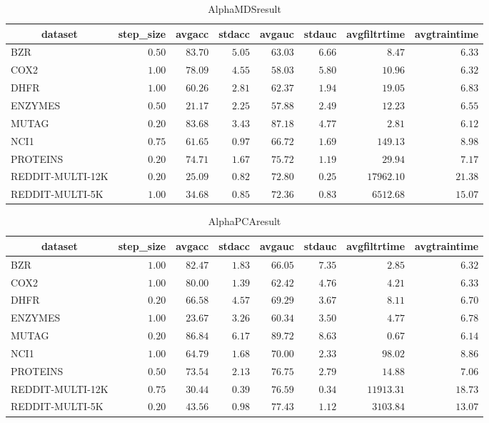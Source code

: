 \begin{table}[!tbp]
\caption{AlphaMDSresult\label{AlphaMDSresult}} 
{\centering
\begin{tabular}{lrrrrrrr}
\hline\hline
\multicolumn{1}{c}{dataset}&\multicolumn{1}{c}{step_size}&\multicolumn{1}{c}{avgacc}&\multicolumn{1}{c}{stdacc}&\multicolumn{1}{c}{avgauc}&\multicolumn{1}{c}{stdauc}&\multicolumn{1}{c}{avgfiltrtime}&\multicolumn{1}{c}{avgtraintime}\tabularnewline
\hline
BZR&$0.50$&$83.70$&$5.05$&$63.03$&$6.66$&$    8.47$&$ 6.33$\tabularnewline
COX2&$1.00$&$78.09$&$4.55$&$58.03$&$5.80$&$   10.96$&$ 6.32$\tabularnewline
DHFR&$1.00$&$60.26$&$2.81$&$62.37$&$1.94$&$   19.05$&$ 6.83$\tabularnewline
ENZYMES&$0.50$&$21.17$&$2.25$&$57.88$&$2.49$&$   12.23$&$ 6.55$\tabularnewline
MUTAG&$0.20$&$83.68$&$3.43$&$87.18$&$4.77$&$    2.81$&$ 6.12$\tabularnewline
NCI1&$0.75$&$61.65$&$0.97$&$66.72$&$1.69$&$  149.13$&$ 8.98$\tabularnewline
PROTEINS&$0.20$&$74.71$&$1.67$&$75.72$&$1.19$&$   29.94$&$ 7.17$\tabularnewline
REDDIT-MULTI-12K&$0.20$&$25.09$&$0.82$&$72.80$&$0.25$&$17962.10$&$21.38$\tabularnewline
REDDIT-MULTI-5K&$1.00$&$34.68$&$0.85$&$72.36$&$0.83$&$ 6512.68$&$15.07$\tabularnewline
\hline
\end{tabular}}
\end{table}
\begin{table}[!tbp]
\caption{AlphaPCAresult\label{AlphaPCAresult}} 
{\centering
\begin{tabular}{lrrrrrrr}
\hline\hline
\multicolumn{1}{c}{dataset}&\multicolumn{1}{c}{step_size}&\multicolumn{1}{c}{avgacc}&\multicolumn{1}{c}{stdacc}&\multicolumn{1}{c}{avgauc}&\multicolumn{1}{c}{stdauc}&\multicolumn{1}{c}{avgfiltrtime}&\multicolumn{1}{c}{avgtraintime}\tabularnewline
\hline
BZR&$1.00$&$82.47$&$1.83$&$66.05$&$7.35$&$    2.85$&$ 6.32$\tabularnewline
COX2&$1.00$&$80.00$&$1.39$&$62.42$&$4.76$&$    4.21$&$ 6.33$\tabularnewline
DHFR&$0.20$&$66.58$&$4.57$&$69.29$&$3.67$&$    8.11$&$ 6.70$\tabularnewline
ENZYMES&$1.00$&$23.67$&$3.26$&$60.34$&$3.50$&$    4.77$&$ 6.78$\tabularnewline
MUTAG&$0.20$&$86.84$&$6.17$&$89.72$&$8.63$&$    0.67$&$ 6.14$\tabularnewline
NCI1&$1.00$&$64.79$&$1.68$&$70.00$&$2.33$&$   98.02$&$ 8.86$\tabularnewline
PROTEINS&$0.50$&$73.54$&$2.13$&$76.75$&$2.79$&$   14.88$&$ 7.06$\tabularnewline
REDDIT-MULTI-12K&$0.75$&$30.44$&$0.39$&$76.59$&$0.34$&$11913.31$&$18.73$\tabularnewline
REDDIT-MULTI-5K&$0.20$&$43.56$&$0.98$&$77.43$&$1.12$&$ 3103.84$&$13.07$\tabularnewline
\hline
\end{tabular}}
\end{table}
